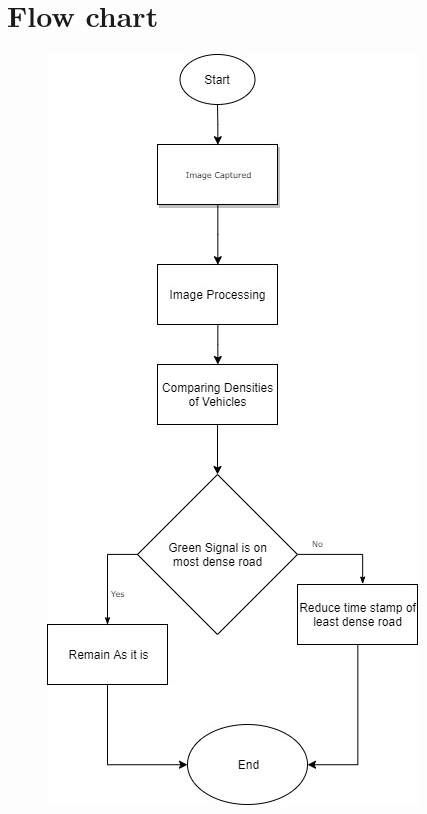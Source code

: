 \documentclass[]{article}
\begin{document}
\section*{Flow chart}
\begin{figure}[!htb]
\includegraphics[scale=.40]{1.jpg}
\end{figure}

\pagebreak
\end{document}
